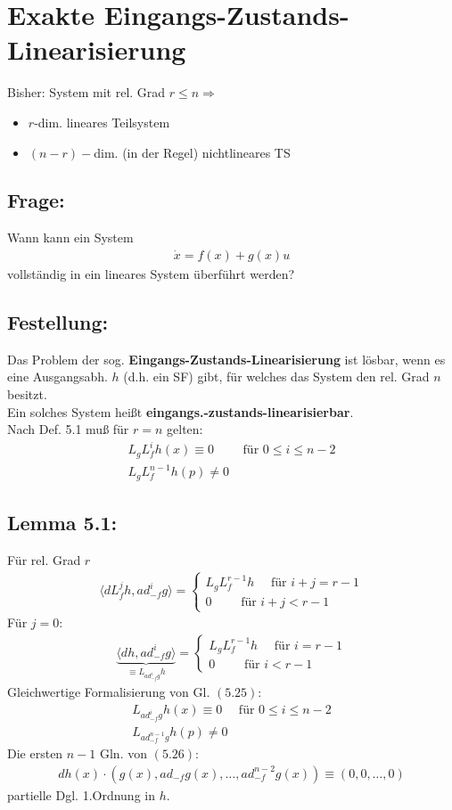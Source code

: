 \documentclass[ngerman]{tudscrreprt}
\begin{document}
\section{Exakte Eingangs-Zustands-Linearisierung}
Bisher: System mit rel. Grad $r\le n \Rightarrow $
\begin{itemize}
\item $r$-dim. lineares Teilsystem
\item $(n-r)-$dim. (in der Regel) nichtlineares TS
\end{itemize}
\subsection*{Frage:} Wann kann ein System
\begin{align*}
\dot x = f(x) + g(x)u \tag{5.1}
\end{align*} vollständig in ein lineares System überführt werden?
\subsection*{Festellung:} Das Problem der sog. \textbf{Eingangs-Zustands-Linearisierung} ist lösbar, wenn es eine Ausgangsabh. $h$ (d.h. ein SF) gibt, für welches das System den rel. Grad $n$ besitzt.\\ 
Ein solches System heißt \textbf{eingangs.-zustands-linearisierbar}.\\ 
Nach Def. 5.1 muß für $r=n$ gelten: \begin{align*}
L_g L_f^i h(x) \equiv 0 \qquad \text{ für } 0\le i \le n-2 \\ 
L_g L_f^{n-1} h(p) \ne 0 \tag{5.25}
\end{align*}
\subsection*{Lemma 5.1:} Für rel. Grad $r$ \begin{align*}
\langle dL_f^j h, ad_{-f}^i g \rangle = \left\{ \begin{matrix} L_g L_f^{r-1} h \quad \text{ für } i+j = r-1\\ 0 \qquad \text{ für } i+j < r-1 \end{matrix} \right.
\end{align*}
Für $j=0$:
\begin{align*}
\underbrace{\langle dh, ad_{-f}^i g \rangle }_{\equiv L_{ad_{-f}^i g} h}= \left\{ \begin{matrix} L_g L_f^{r-1} h \quad \text{ für } i = r-1\\ 0 \qquad \text{ für } i< r-1 \end{matrix} \right.
\end{align*}
Gleichwertige Formalisierung von Gl. $(5.25):$
\begin{align*}
L_{ad_{-f}^i g} h(x) \equiv 0 \quad \text{ für } 0\le i\le n-2\\ 
L_{ad_{-f}^{n-1} g} h(p)\ne 0 \tag{5.26}
\end{align*}
Die ersten $n-1$ Gln. von $(5.26)$: \begin{align*}
dh(x)\cdot (g(x), ad_{-f}g(x), \dots, ad_{-f}^{n-2} g(x) )\equiv (0,0,\dots,0) \tag{5.27}
\end{align*}
partielle Dgl. 1.Ordnung in $h$.
\end{document}
